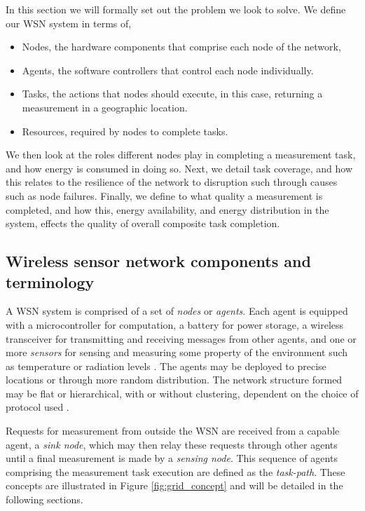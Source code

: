 In this section we will formally set out the problem we look to solve. We define our WSN system in terms of,
\begin{itemize}
	\item Nodes, the hardware components that comprise each node of the network,
	\item Agents, the software controllers that control each node individually.
	\item Tasks, the actions that nodes should execute, in this case, returning a measurement in a geographic location.
	\item Resources, required by nodes to complete tasks.  
\end{itemize}
We then look at the roles different nodes play in completing a measurement task, and how energy is consumed in doing so. Next, we detail task coverage, and how this relates to the resilience of the network to disruption such through causes such as node failures. Finally, we define to what quality a measurement is completed, and how this, energy availability, and energy distribution in the system, effects the quality of overall composite task completion. 

\subsection{Wireless sensor network components and terminology}

A WSN system is comprised of a set of \textit{nodes} or \textit{agents}. Each agent is equipped with a microcontroller for computation, a battery for power storage, a wireless transceiver for  transmitting and receiving messages from other agents, and one or more \textit{sensors} for sensing and measuring some property of the environment such as temperature or radiation levels \citep{muhammad_r_ahmed_2012_1072589}. The agents may be deployed to precise locations or through more random distribution. The network structure formed may be flat or hierarchical, with or without clustering, dependent on the choice of protocol used \citep{Carlos-Mancilla2016b}. 


Requests for measurement from outside the WSN are received from a capable agent, a \textit{sink node}, which may then relay these requests through other agents until a final measurement is made by a \textit{sensing node}. This sequence of agents comprising the measurement task execution are defined as the \textit{task-path}. These concepts are illustrated in Figure \ref{fig:grid_concept} and will be detailed in the following sections.